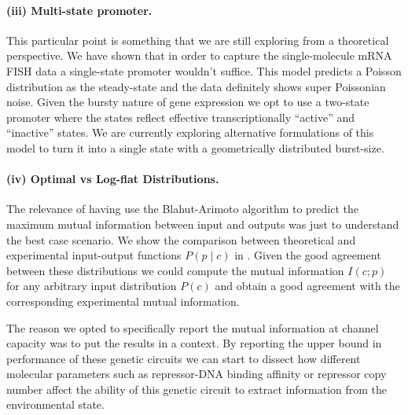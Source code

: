\paragraph{(iii) Multi-state promoter.}
This particular point is something that we are still exploring from a
theoretical perspective. We have shown that in order to capture the
single-molecule mRNA FISH data a single-state promoter wouldn't suffice. This
model predicts a Poisson distribution as the steady-state and the data
definitely shows super Poissonian noise. Given the bursty nature of gene
expression we opt to use a two-state promoter where the states reflect
effective transcriptionally ``active'' and ``inactive'' states. We are
currently exploring alternative formulations of this model to turn it into a
single state with a geometrically distributed burst-size.

\paragraph{(iv) Optimal vs Log-flat Distributions.}
The relevance of having use the Blahut-Arimoto algorithm to predict the maximum
mutual information between input and outputs was just to understand the best
case scenario. We show the comparison between theoretical and experimental
input-output functions $P(p \mid c)$ in . Given the good
agreement between these distributions we could compute the mutual information
$I(c; p)$ for any arbitrary input distribution $P(c)$ and obtain a good
agreement with the corresponding experimental mutual information.

The reason we opted to specifically report the mutual information at channel
capacity was to put the results in a context. By reporting the upper bound in
performance of these genetic circuits we can start to dissect how different
molecular parameters such as repressor-DNA binding affinity or repressor copy
number affect the ability of this genetic circuit to extract information from
the environmental state.

